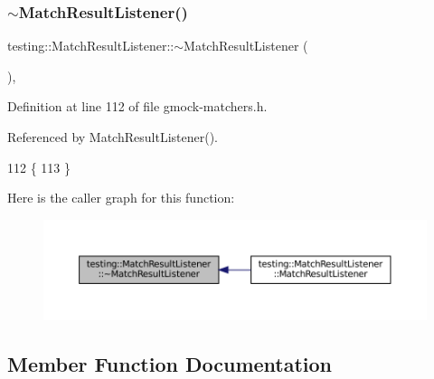 \subsubsection{\texorpdfstring{$\sim$\+Match\+Result\+Listener()}{~MatchResultListener()}}
{\footnotesize\ttfamily testing\+::\+Match\+Result\+Listener\+::$\sim$\+Match\+Result\+Listener (\begin{DoxyParamCaption}{ }\end{DoxyParamCaption})\hspace{0.3cm}{\ttfamily [inline]}, {}}



Definition at line 112 of file gmock-\/matchers.\+h.



Referenced by Match\+Result\+Listener().


\begin{DoxyCode}
112                                                  \{
113 \}
\end{DoxyCode}
Here is the caller graph for this function\+:
\nopagebreak
\begin{figure}[H]
\begin{center}
\leavevmode
\includegraphics[width=350pt]{classtesting_1_1MatchResultListener_aa29f43f7b2ffd850c721a8a33ccbba92_icgraph}
\end{center}
\end{figure}


\subsection{Member Function Documentation}
\mbox{\label{classtesting_1_1MatchResultListener_ad41af985b372f2d8394e01fd52a1e53d}} 
